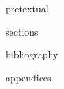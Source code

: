 \documentclass[11pt]{article}
\begin{document}
{pretextual}

{sections}

{bibliography}

\clearpage

{appendices}
\end{document}
